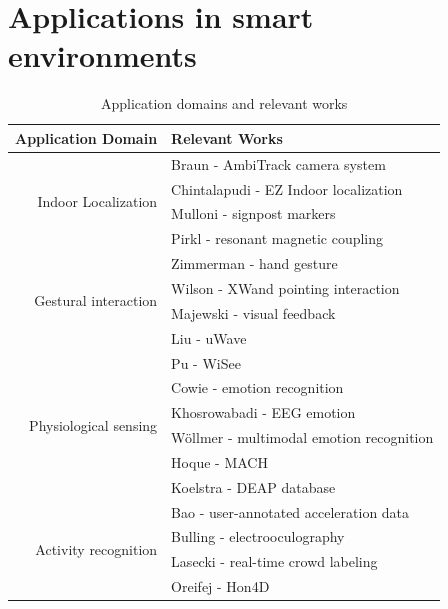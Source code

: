 \section{Applications in smart environments}
\label{ch:rel_se_app}
\begin{table}[htbp]
  \centering
  \caption{Application domains and relevant works}
    \begin{tabular}{rl}
    \toprule
    Application Domain & Relevant Works \\
    \midrule
    \multirow{4}[0]{*}{Indoor Localization} & Braun - AmbiTrack camera system \cite{braun2013ambitrack} \\
          & Chintalapudi - EZ Indoor localization \cite{ chintalapudi2010indoor} \\
          & Mulloni - signpost markers \cite{mulloni2009indoor} \\
          & Pirkl - resonant magnetic coupling \cite{pirkl2013resonant} \\ [1em]
    \multirow{4}[0]{*}{Gestural interaction} & Zimmerman - hand gesture \cite{zimmerman1987hand} \\
          & Wilson - XWand pointing interaction\cite{Wilson2003} \\
          & Majewski - visual feedback \cite{majewski2013providing} \\
          & Liu - uWave \cite{liu2009uwave} \\
          & Pu - WiSee \cite{pu2013whole} \\[1em]
    \multirow{4}[0]{*}{Physiological sensing} & Cowie - emotion recognition \cite{cowie2001emotion} \\
          & Khosrowabadi - EEG emotion \cite{khosrowabadi2010eeg} \\
          & Wöllmer - multimodal emotion recognition \cite{wollmer2010context} \\          
          & Hoque - MACH \cite{hoque2013mach} \\
          & Koelstra - DEAP database \cite{koelstra2012deap} \\[1em]
    \multirow{4}[0]{*}{Activity recognition} & Bao - user-annotated acceleration data \cite{Bao2004} \\
          & Bulling - electrooculography \cite{bulling2011eye} \\
          & Lasecki - real-time crowd labeling \cite{lasecki2013real} \\
          & Oreifej - Hon4D \cite{oreifej2013hon4d} \\[1em]

\end{tabular}
\end{table}
